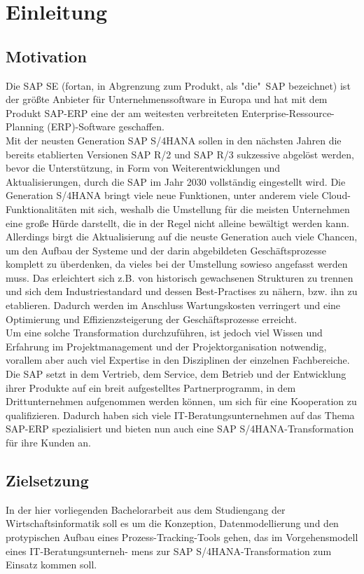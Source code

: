 \section{Einleitung}
\subsection{Motivation}
Die SAP SE (fortan, in Abgrenzung zum Produkt, als "die"\ SAP bezeichnet) ist der größte Anbieter für Unternehmenssoftware in Europa und hat mit dem Produkt SAP-ERP eine der am weitesten verbreiteten Enterprise-Ressource-Planning (ERP)-Software geschaffen. \\Mit der neusten Generation SAP S/4HANA sollen in den nächsten Jahren die bereits etablierten Versionen SAP R/2 und SAP R/3 sukzessive abgelöst werden, bevor die Unterstützung, in Form von Weiterentwicklungen und Aktualisierungen, durch die SAP im Jahr 2030 vollständig eingestellt wird. Die Generation S/4HANA bringt viele neue Funktionen, unter anderem viele Cloud-Funktionalitäten mit sich, weshalb die Umstellung für die meisten Unternehmen eine große Hürde darstellt, die in der Regel nicht alleine bewältigt werden kann. Allerdings birgt die Aktualisierung auf die neuste Generation auch viele Chancen, um den Aufbau der Systeme und der darin abgebildeten Geschäftsprozesse komplett zu überdenken, 
da vieles bei der Umstellung sowieso angefasst werden muss. Das erleichtert sich z.B. von historisch gewachsenen Strukturen zu trennen und sich dem Industriestandard und dessen Best-Practises zu nähern, bzw. ihn zu etablieren. Dadurch werden im Anschluss Wartungskosten verringert und eine Optimierung und Effizienzsteigerung der Geschäftsprozesse erreicht.\\ Um eine solche Transformation durchzuführen, ist jedoch viel Wissen und Erfahrung im Projektmanagement und der Projektorganisation notwendig, vorallem aber auch viel Expertise in den Disziplinen der einzelnen Fachbereiche.
Die SAP setzt in dem Vertrieb, dem Service, dem Betrieb und der Entwicklung ihrer Produkte auf ein breit aufgestelltes Partnerprogramm, in dem Drittunternehmen aufgenommen werden können, um sich für eine Kooperation zu qualifizieren. Dadurch haben sich viele IT-Beratungsunternehmen auf das Thema SAP-ERP spezialisiert und bieten nun auch eine SAP S/4HANA-Transformation für ihre Kunden an.

\subsection{Zielsetzung}
In der hier vorliegenden Bachelorarbeit aus dem Studiengang der Wirtschaftsinformatik soll es um die Konzeption, Datenmodellierung und den protypischen Aufbau eines Prozess-Tracking-Tools gehen, das im Vorgehensmodell eines IT-Beratungsunterneh- mens zur SAP S/4HANA-Transformation zum Einsatz kommen soll.\\ 

